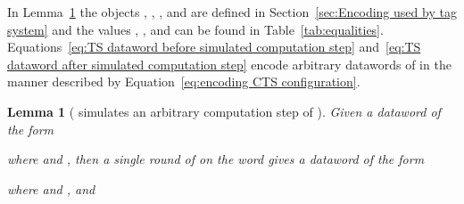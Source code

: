 \documentclass[11pt]{article} \usepackage{amsfonts,amsmath,amssymb,amsthm}
\newtheorem{lemma}{Lemma}
\begin{document}
In Lemma~\ref{lem:simulating a computation step of C} the objects , , , and  are defined in Section~\ref{sec:Encoding used by tag system} and the values , ,  and  can be found in Table~\ref{tab:equalities}. Equations~\eqref{eq:TS dataword before simulated computation step} and~\eqref{eq:TS dataword after simulated computation step} encode arbitrary datawords of  in the manner described by Equation~\eqref{eq:encoding CTS configuration}.

\begin{lemma}[ simulates an arbitrary computation step of ]\label{lem:simulating a computation step of C}
Given a dataword of the form

where  and , then a single round of  on the word  gives a dataword of the form

where  and , and

\end{lemma}
\end{document}

